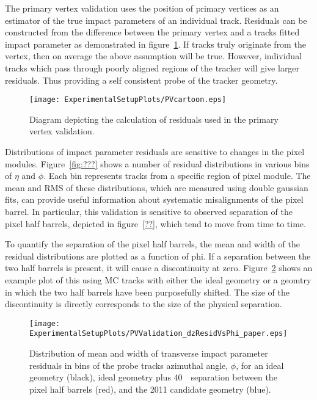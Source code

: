 

The primary vertex validation uses the position of primary vertices as
an estimator of the true impact parameters of an individual track.  
Residuals can be constructed from the difference between the primary 
vertex and a tracks fitted impact parameter as demonstrated in 
figure~\ref{fig:PVcartoon}.    If tracks truly originate from 
the vertex, then on average the above assumption
will be true.  However, individual tracks which pass through poorly 
aligned regions of the tracker will give larger residuals.  Thus providing
a self consistent probe of the tracker geometry.  

\begin{figure}
\begin{center}
\texttt{[image: ExperimentalSetupPlots/PVcartoon.eps]}
\caption{Diagram depicting the calculation of residuals used in 
the primary vertex validation.}
\label{fig:PVcartoon}
\end{center}
\end{figure}

Distributions of impact parameter residuals are sensitive to changes in the
pixel modules.
Figure~\ref{fig:???}
shows a number of residual distributions in various bins of $\eta$ and
$\phi$.  Each bin represents tracks from a specific region of pixel 
module.  The mean and RMS of these distributions, which are measured
using double gaussian fits, can provide useful
information about systematic misalignments of the pixel barrel.  In
particular, this validation is sensitive to observed separation of the
pixel half barrels, depicted in figure~\ref{??}, which tend to move from 
time to time. 

To quantify the separation of the pixel half barrels, the mean and width
of the residual distributions are plotted as a function of phi.  If a 
separation between the two half barrels is present, it will cause a discontinuity
at zero.  Figure~\ref{fig:dzResidVsPhi} shows an example plot of this
using MC tracks with either the ideal geometry or a geomtry in which the 
two half barrels have been purposefully shifted.  The size of the
discontinuity is directly corresponds to the size of the physical separation.  

\begin{figure}
\begin{center}
\texttt{[image: ExperimentalSetupPlots/PVValidation\_dzResidVsPhi\_paper.eps]}
\caption{Distribution of mean and width of transverse impact parameter residuals 
in bins of the probe tracks azimuthal angle, $\phi$, for an ideal geometry (black), 
ideal geometry plus 40~\microns~separation between the pixel half barrels (red),
and the 2011 candidate geometry (blue).}
\label{fig:dzResidVsPhi}
\end{center}
\end{figure}


